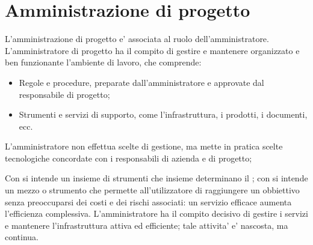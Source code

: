 \section{Amministrazione di progetto}
L'amministrazione di progetto e' associata al ruolo dell'amministratore. L'amministratore di progetto ha il compito di gestire e mantenere organizzato e ben funzionante l'ambiente di lavoro, che comprende:

\begin{itemize}
	\item Regole e procedure, preparate dall'amministratore e approvate dal responsabile di progetto;
	\item Strumenti e servizi di supporto, come l'infrastruttura, i prodotti, i documenti, ecc. 
\end{itemize}

L'amministratore non effettua scelte di gestione, ma mette in pratica scelte tecnologiche concordate con i responsabili di azienda e di progetto;

Con  si intende un insieme di strumenti che insieme determinano il ; con  si intende un mezzo o strumento che permette all'utilizzatore di raggiungere un obbiettivo senza preoccuparsi dei costi e dei rischi associati: un servizio efficace aumenta l'efficienza complessiva. L'amministratore ha il compito decisivo di gestire i servizi e mantenere l'infrastruttura attiva ed efficiente; tale attivita' e' nascosta, ma continua.

